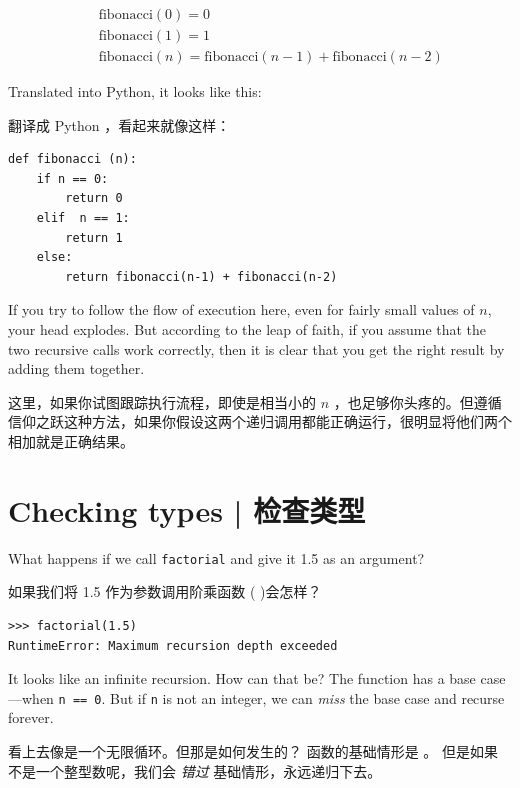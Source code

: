 %
\begin{eqnarray*}
&& \mathrm{fibonacci}(0) = 0 \\
&& \mathrm{fibonacci}(1) = 1 \\
&& \mathrm{fibonacci}(n) = \mathrm{fibonacci}(n-1) + \mathrm{fibonacci}(n-2)
\end{eqnarray*}

%
Translated into Python, it looks like this:

翻译成 Python ，看起来就像这样：

\begin{lstlisting}
def fibonacci (n):
    if n == 0:
        return 0
    elif  n == 1:
        return 1
    else:
        return fibonacci(n-1) + fibonacci(n-2)
\end{lstlisting}

%
If you try to follow the flow of execution here, even for fairly
small values of $n$, your head explodes.  But according to the
leap of faith, if you assume that the two recursive calls
work correctly, then it is clear that you get
the right result by adding them together.

这里，如果你试图跟踪执行流程，即使是相当小的 $n$ ，也足够你头疼的。但遵循信仰之跃这种方法，如果你假设这两个递归调用都能正确运行，很明显将他们两个相加就是正确结果。



\section{Checking types  |  检查类型}
\label{guardian}

What happens if we call {\tt factorial} and give it 1.5 as an argument?

如果我们将 1.5 作为参数调用阶乘函数 (  )会怎样？

  
  

\begin{lstlisting}
>>> factorial(1.5)
RuntimeError: Maximum recursion depth exceeded
\end{lstlisting}

%
It looks like an infinite recursion.  How can that be?  The function
has a base case---when {\tt n == 0}.  But if {\tt n} is not an integer,
we can {\em miss} the base case and recurse forever.

看上去像是一个无限循环。但那是如何发生的？ 函数的基础情形是  。
但是如果  不是一个整型数呢，我们会 {\em 错过} 基础情形，永远递归下去。
  

